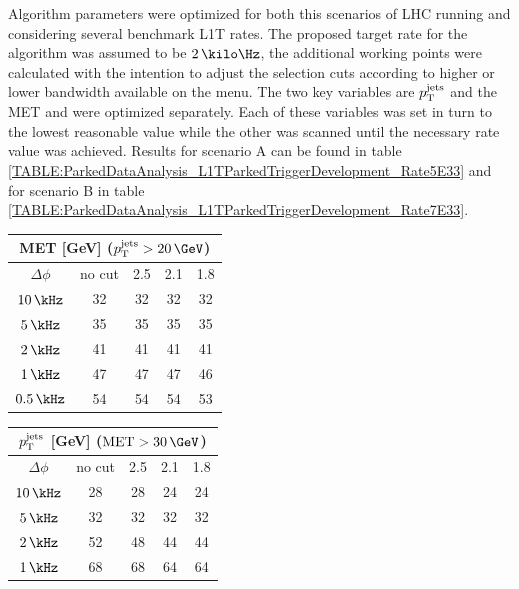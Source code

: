 Algorithm parameters were optimized for both this scenarios of \gls{LHC} running and considering several benchmark \gls{L1T} rates. The proposed target rate for the algorithm was assumed to be $2\,\kilo\Hz$, the additional working points were calculated with the intention to adjust the selection cuts according to higher or lower bandwidth available on the menu. The two key variables are $p_{\mathrm{T}}^{\text{jets}}$ and the \gls{MET} and were optimized separately. Each of these variables was set in turn to the lowest reasonable value while the other was scanned until the necessary rate value was achieved.  Results for scenario A can be found in table \ref{TABLE:ParkedDataAnalysis_L1TParkedTriggerDevelopment_Rate5E33} and for scenario B in table \ref{TABLE:ParkedDataAnalysis_L1TParkedTriggerDevelopment_Rate7E33}.

\begin{table}[!htb]
\begin{minipage}{.5\linewidth}
  \centering
  \begin{tabular}{|c||c|c|c|c|}
  \hline
  \multicolumn{5}{|c|}{MET [GeV] ($\pt^{\text{jets}} > 20\,\GeV$)} \\
  \hline\hline
  $\Delta\phi$ & no cut & 2.5 & 2.1 & 1.8 \\
  \hline
   $10\,\kHz$  &     32 &  32 &  32 &  32 \\
    $5\,\kHz$  &     35 &  35 &  35 &  35 \\
  \hline\hline
    $2\,\kHz$  &     41 &  41 &  41 &  41 \\
  \hline\hline
    $1\,\kHz$  &     47 &  47 &  47 &  46 \\
  $0.5\,\kHz$  &     54 &  54 &  54 &  53 \\
  \hline
  \end{tabular}
\end{minipage}%
\begin{minipage}{.5\linewidth}
  \centering
  \begin{tabular}{|c||c|c|c|c|}
  \hline
  \multicolumn{5}{|c|}{$p_{\mathrm{T}}^{\text{jets}}$ [GeV] ($\text{MET}>30\,\GeV$)} \\
  \hline
  $\Delta\phi$ & no cut & 2.5 & 2.1 & 1.8 \\
  \hline\hline
   $10\,\kHz$  &     28 &  28 &  24 &  24 \\
    $5\,\kHz$  &     32 &  32 &  32 &  32 \\
  \hline\hline
    $2\,\kHz$  &     52 &  48 &  44 &  44 \\
  \hline\hline
    $1\,\kHz$  &     68 &  68 &  64 &  64 \\

\end{tabular}
\end{minipage}
\end{table}
